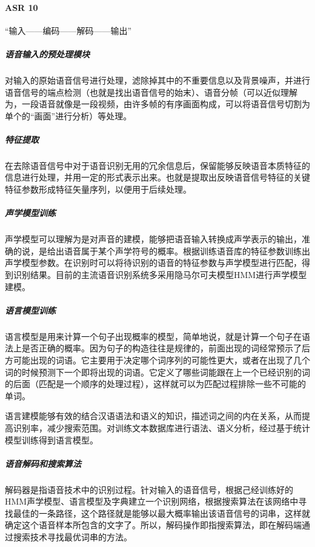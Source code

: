 \documentclass[letterpaper,10pt,english]{sphinxmanual}
\begin{document}
\paragraph{ASR 10\sphinxfootnotemark[964]}
\label{\detokenize{chapter_AI_dive/chatbot:asr-10}}%
\begin{footnotetext}[964]\sphinxAtStartFootnote
{}
%
\end{footnotetext}\ignorespaces 
“输入——编码——解码——输出”


\subparagraph{语音输入的预处理模块}
\label{\detokenize{chapter_AI_dive/chatbot:id3}}
对输入的原始语音信号进行处理，滤除掉其中的不重要信息以及背景噪声，并进行语音信号的端点检测（也就是找出语音信号的始末）、语音分帧（可以近似理解为，一段语音就像是一段视频，由许多帧的有序画面构成，可以将语音信号切割为单个的“画面”进行分析）等处理。


\subparagraph{特征提取}
\label{\detokenize{chapter_AI_dive/chatbot:id4}}
在去除语音信号中对于语音识别无用的冗余信息后，保留能够反映语音本质特征的信息进行处理，并用一定的形式表示出来。也就是提取出反映语音信号特征的关键特征参数形成特征矢量序列，以便用于后续处理。


\subparagraph{声学模型训练}
\label{\detokenize{chapter_AI_dive/chatbot:id5}}
声学模型可以理解为是对声音的建模，能够把语音输入转换成声学表示的输出，准确的说，是给出语音属于某个声学符号的概率。根据训练语音库的特征参数训练出声学模型参数。在识别时可以将待识别的语音的特征参数与声学模型进行匹配，得到识别结果。目前的主流语音识别系统多采用隐马尔可夫模型HMM进行声学模型建模。


\subparagraph{语言模型训练}
\label{\detokenize{chapter_AI_dive/chatbot:id6}}
语言模型是用来计算一个句子出现概率的模型，简单地说，就是计算一个句子在语法上是否正确的概率。因为句子的构造往往是规律的，前面出现的词经常预示了后方可能出现的词语。它主要用于决定哪个词序列的可能性更大，或者在出现了几个词的时候预测下一个即将出现的词语。它定义了哪些词能跟在上一个已经识别的词的后面（匹配是一个顺序的处理过程），这样就可以为匹配过程排除一些不可能的单词。

语言建模能够有效的结合汉语语法和语义的知识，描述词之间的内在关系，从而提高识别率，减少搜索范围。对训练文本数据库进行语法、语义分析，经过基于统计模型训练得到语言模型。


\subparagraph{语音解码和搜索算法}
\label{\detokenize{chapter_AI_dive/chatbot:id7}}
解码器是指语音技术中的识别过程。针对输入的语音信号，根据己经训练好的HMM声学模型、语言模型及字典建立一个识别网络，根据搜索算法在该网络中寻找最佳的一条路径，这个路径就是能够以最大概率输出该语音信号的词串，这样就确定这个语音样本所包含的文字了。所以，解码操作即指搜索算法，即在解码端通过搜索技术寻找最优词串的方法。
\end{document}
